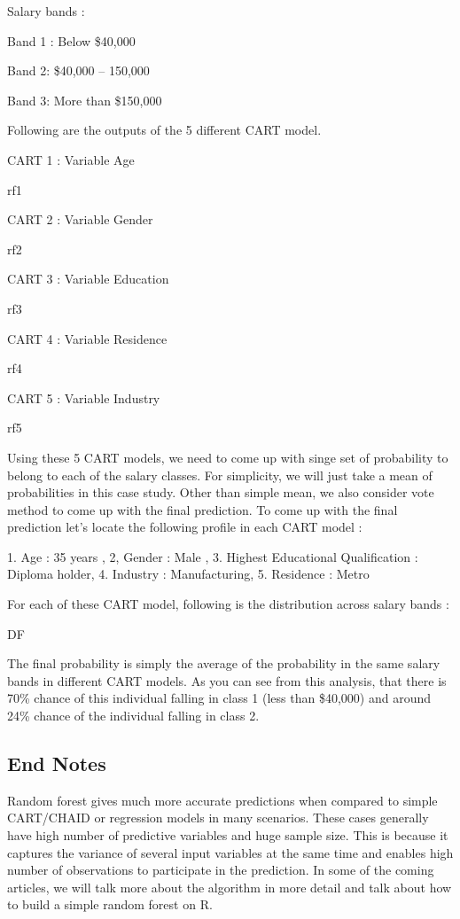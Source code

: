 \documentclass[a4paper,12pt]{article}
\begin{document}
Salary bands :

Band 1 : Below \$40,000

Band 2: \$40,000 – 150,000

Band 3: More than \$150,000

Following are the outputs of the 5 different CART model.

CART 1 : Variable Age

rf1

CART 2 : Variable Gender

rf2

CART 3 : Variable Education

rf3

CART 4 : Variable Residence

rf4

CART 5 : Variable Industry

rf5

Using these 5 CART models, we need to come up with singe set of probability to belong to each of the salary classes. For simplicity, we will just take a mean of probabilities in this case study. Other than simple mean, we also consider vote method to come up with the final prediction. To come up with the final prediction let’s locate the following profile in each CART model :

1. Age : 35 years , 2, Gender : Male , 3. Highest Educational Qualification : Diploma holder, 4. Industry : Manufacturing, 5. Residence : Metro

For each of these CART model, following is the distribution across salary bands :

DF

The final probability is simply the average of the probability in the same salary bands in different CART models. As you can see from this analysis, that there is 70\% chance of this individual falling in class 1 (less than \$40,000) and around 24\% chance of the individual falling in class 2.



\subsection*{End Notes}
Random forest gives much more accurate predictions when compared to simple CART/CHAID or regression models in many scenarios. These cases generally have high number of predictive variables and huge sample size. This is because it captures the variance of several input variables at the same time and enables high number of observations to participate in the prediction. In some of the coming articles, we will talk more about the algorithm in more detail and talk about how to build a simple random forest on R.
\end{document}

